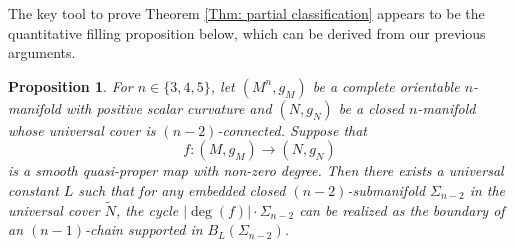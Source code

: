 \documentclass[11pt,letterpaper]{amsart}
\numberwithin{equation}{section}
\newtheorem{proposition}[theorem]{Proposition}
\theoremstyle{definition}
\begin{document}
The key tool to prove Theorem \ref{Thm: partial classification} appears to be the quantitative filling proposition below, which can be derived from our previous arguments.

\begin{proposition}\label{Prop: quantitative filling}
    For $n\in\{3,4,5\}$, let $(M^n,g_M)$ be a complete orientable $n$-manifold with positive scalar curvature and $(N,g_N)$ be a closed $n$-manifold whose universal cover is $(n-2)$-connected. Suppose that
 \[
f:(M,g_{M})\to (N,g_{N})
\]
is a smooth quasi-proper map with non-zero degree. Then there exists a universal constant $L$ such that for any embedded closed $(n-2)$-submanifold $\Sigma_{n-2}$ in the universal cover $\tilde N$, the cycle $|\deg(f)|\cdot\Sigma_{n-2}$ can be realized as the boundary of an $(n-1)$-chain supported in $B_{L}(\Sigma_{n-2})$.
\end{proposition}
\end{document}
